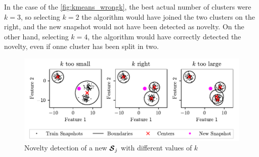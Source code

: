 In the case of the \autoref{fig:kmeans_wrongk}, the best actual number of clusters were $k=3$, so selecting $k=2$ the algorithm would have joined the two clusters on the right, and the new snapshot would not have been detected as novelty. On the other hand, selecting $k=4$, the algorithm would have correctly detected the novelty, even if onne cluster has been split in two.

\begin{figure}
  \centering
  \includegraphics[width=\textwidth]{images/Kmeans_wrongk.pdf}
  \caption{Novelty detection of a new $\bm{\mathcal{S}}_j$ with different values of $k$}
  \label{fig:kmeans_wrongk}
\end{figure}

